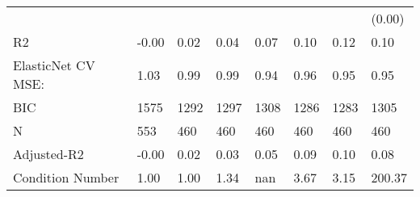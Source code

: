 \begin{table*}
\begin{center}
\begin{tabular}{llllllll}
                                               &          &            &         &         &          &                    & (0.00)  \\
R2                                             & -0.00    & 0.02       & 0.04    & 0.07    & 0.10     & 0.12               & 0.10    \\
ElasticNet CV MSE:                             & 1.03     & 0.99       & 0.99    & 0.94    & 0.96     & 0.95               & 0.95    \\
BIC                                            & 1575     & 1292       & 1297    & 1308    & 1286     & 1283               & 1305    \\
N                                              & 553      & 460        & 460     & 460     & 460      & 460                & 460     \\
Adjusted-R2                                    & -0.00    & 0.02       & 0.03    & 0.05    & 0.09     & 0.10               & 0.08    \\
Condition Number                               & 1.00     & 1.00       & 1.34    & nan     & 3.67     & 3.15               & 200.37  \\
\hline
\end{tabular}
\end{center}
\end{table*}